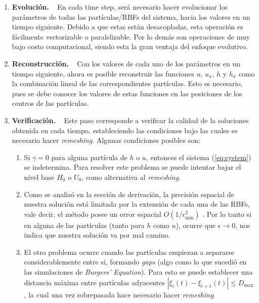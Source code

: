 \documentclass[spanish]{article} %
\providecommand{\DIFaddtex}[1]{{\protect\color{blue} \sf #1}} %
\providecommand{\DIFadd}[1]{\texorpdfstring{\DIFaddtex{#1}}{#1}} %
\begin{document}
    \begin{enumerate}
        \item \DIFadd{\textbf{Evolución.} }\  \DIFadd{En cada time step, será necesario hacer evolucionar los parámetros de todas las partículas/RBFs del sistema, hacia los valores en un tiempo siguiente. Debido a que estas están desacopladas, esta operación es fácilmente vectorizable o paralelizable. Por lo demás son operaciones de muy bajo costo computacional, siendo esta la gran ventaja del enfoque evolutivo.
        }\item \DIFadd{\textbf{Reconstrucción.} }\ \DIFadd{Con los valores de cada uno de los parámetros en un tiempo siguiente, ahora es posible reconstruir las funciones $u$, $u_x$, $h$ y $h_x$ como la combinación lineal de las correspondientes partículas. Esto es necesario, pues se debe conocer los valores de estas funciones en las posiciones de los centros de las partículas.
        }\item \DIFadd{\textbf{Verificación.} }\ \DIFadd{Este paso corresponde a verificar la calidad de la soluciones obtenida en cada tiempo, estableciendo las condiciones bajo las cuales es necesario hacer \textit{remeshing}. Algunas condiciones posibles son:
}

        \begin{enumerate}
            \item \DIFadd{Si $\gamma=0$ para alguna partícula de $h$ o $u$, entonces el sistema (\ref{eq:system}) se indetermina. Para resolver este problema se puede intentar bajar el nivel base $H_0$ o $U_0$, como alternativa al \textit{remeshing}.
            }\item \DIFadd{Como se analizó en la sección de derivación, la precisión espacial de nuestra solución está limitada por la extensión de cada una de las RBFs, vale decir, el método posee un error espacial $\displaystyle O(1 / \epsilon_{\text{min}}^2)$ }\footnotemark[1]\DIFadd{. Por lo tanto si en alguna de las partículas (tanto para $h$ como $u$), ocurre que $\epsilon \rightarrow 0$, nos indica que nuestra solución va por mal camino.
            }\item \DIFadd{El otro problema ocurre cuando las partículas empiezan a separarse considerablemente entre sí, formando \textit{gaps} (algo como lo que sucedió en las simulaciones de \textit{Burgers' Equation}). Para esto se puede establecer una distancia máxima entre partículas adyacentes $|\xi_i(t)-\xi_{i+1}(t)| \leq D_{\text{max}}$, la cual una vez sobrepasada hace necesario hacer \textit{remeshing}.
        }\end{enumerate}
    \end{enumerate}
\end{document}

